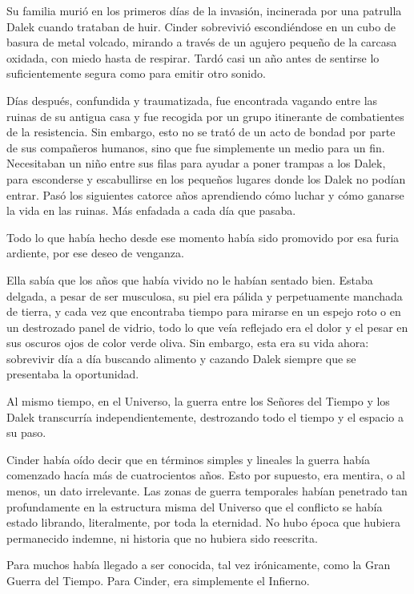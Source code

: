 Su familia murió en los primeros días de la invasión, incinerada por una patrulla Dalek cuando trataban de huir. Cinder sobrevivió escondiéndose en un cubo de basura de metal volcado, mirando a través de un agujero pequeño de la carcasa oxidada, con miedo hasta de respirar. Tardó casi un año antes de sentirse lo suficientemente segura como para emitir otro sonido.

Días después, confundida y traumatizada, fue encontrada vagando entre las ruinas de su antigua casa y fue recogida por un grupo itinerante de combatientes de la resistencia. Sin embargo, esto no se trató de un acto de bondad por parte de sus compañeros humanos, sino que fue simplemente un medio para un fin. Necesitaban un niño entre sus filas para ayudar a poner trampas a los Dalek, para esconderse y escabullirse en los pequeños lugares donde los Dalek no podían entrar. Pasó los siguientes catorce años aprendiendo cómo luchar y cómo ganarse la vida en las ruinas. Más enfadada a cada día que pasaba.

Todo lo que había hecho desde ese momento había sido promovido por esa furia ardiente, por ese deseo de venganza.

Ella sabía que los años que había vivido no le habían sentado bien. Estaba delgada, a pesar de ser musculosa, su piel era pálida y perpetuamente manchada de tierra, y cada vez que encontraba tiempo para mirarse en un espejo roto o en un destrozado panel de vidrio, todo lo que veía reflejado era el dolor y el pesar en sus oscuros ojos de color verde oliva. Sin embargo, esta era su vida ahora: sobrevivir día a día buscando alimento y cazando Dalek siempre que se presentaba la oportunidad.

Al mismo tiempo, en el Universo, la guerra entre los Señores del Tiempo y los Dalek transcurría independientemente, destrozando todo el tiempo y el espacio a su paso.

Cinder había oído decir que en términos simples y lineales la guerra había comenzado hacía más de cuatrocientos años. Esto por supuesto, era mentira, o al menos, un dato irrelevante. Las zonas de guerra temporales habían penetrado tan profundamente en la estructura misma del Universo que el conflicto se había estado librando, literalmente, por toda la eternidad. No hubo época que hubiera permanecido indemne, ni historia que no hubiera sido reescrita.

Para muchos había llegado a ser conocida, tal vez irónicamente, como la Gran Guerra del Tiempo. Para Cinder, era simplemente el Infierno.

